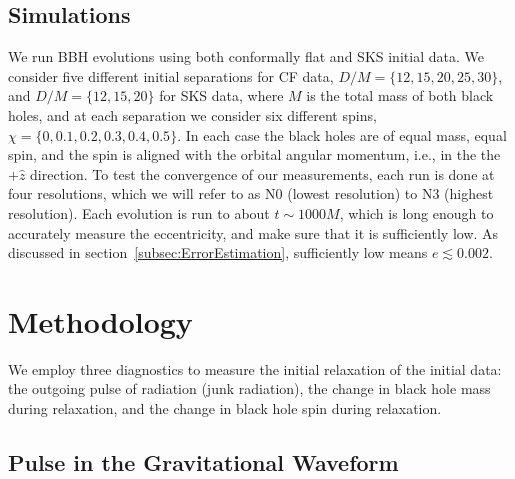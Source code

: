 
\subsection{Simulations}

We run BBH evolutions using both conformally flat and SKS initial
data.  We consider five different initial separations for CF data,
$D/M=\{12,15,20,25,30\}$, and $D/M=\{12,15,20\}$ for SKS data, where $M$ is the total mass of both black
holes, and at each separation we consider  six different spins,
$\chi=\{0,0.1,0.2,0.3,0.4,0.5\}$. In each case the black holes are of
equal mass, equal spin, and the spin is aligned with the orbital
angular momentum, i.e., in the the $+\hat{z}$ direction. To test the
convergence of our measurements, each run is done at four
resolutions, which we will refer to as N0 (lowest resolution) to N3
(highest resolution). Each evolution is
run to about $t\sim1000M$, which is long enough to accurately measure the
eccentricity, and make sure that it is sufficiently low. As discussed in
section~\ref{subsec:ErrorEstimation}, sufficiently low means
$e\lesssim 0.002$.

\section{Methodology}
\label{sec:Methodology}

We employ three diagnostics to measure the initial relaxation of
the initial data: the outgoing pulse of radiation (junk radiation),
the change in black hole mass during relaxation, and the change in
black hole spin during relaxation.



\subsection{Pulse in the Gravitational Waveform}

